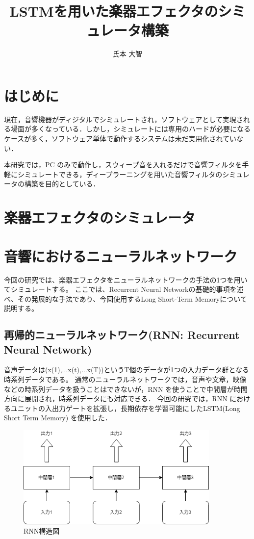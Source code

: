 \documentclass{jreport}		%
\title{LSTMを用いた楽器エフェクタのシミュレータ構築}	%
\author{氏本 大智}			%
\begin{document}
%
\maketitle		%
\tableofcontents	%

\chapter{はじめに}
現在，音響機器がディジタルでシミュレートされ，ソフトウェアとして実現される場面が多くなっている．しかし，シミュレートには専用のハードが必要になるケースが多く，ソフトウェア単体で動作するシステムは未だ実用化されていない．

本研究では，PC のみで動作し，スウィープ音を入れるだけで音響フィルタを手軽にシミュレートできる，ディープラーニングを用いた音響フィルタのシミュレータの構築を目的としている．

\chapter{楽器エフェクタのシミュレータ}

\chapter{音響におけるニューラルネットワーク}
今回の研究では、楽器エフェクタをニューラルネットワークの手法の1つを用いてシミュレートする。
ここでは、Recurrent Neural Networkの基礎的事項を述べ、その発展的な手法であり、今回使用するLong Short-Term Memoryについて説明する。

\section{再帰的ニューラルネットワーク(RNN: Recurrent Neural Network)}
音声データは(x(1),...x(t),...x(T))というT個のデータが1つの入力データ群となる時系列データである。
通常のニューラルネットワークでは，音声や文章，映像などの時系列データを扱うことはできないが，RNN を使うことで中間層が時間方向に展開され，時系列データにも対応できる．
今回の研究では，RNN におけるユニットの入出力ゲートを拡張し，長期依存を学習可能にしたLSTM(Long Short Term Memory) を使用した．

\begin{figure}[htbp]
 \begin{center}
  \includegraphics[width=100mm]{RNN.png}
 \end{center}
 \caption{RNN構造図}
 \label{fig:one}
\end{figure}
\end{document}
